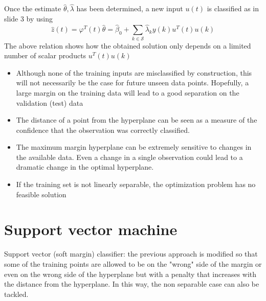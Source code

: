 \documentclass{book}
\theoremstyle{definition}
\theoremstyle{remark}
\theoremstyle{remark}
\begin{document}
Once the estimate $\hat{\theta},\hat{\lambda}$ has been determined, a new input $u(t)$ is classified as in slide 3 by using 
\[
    \hat{z}(t)=\varphi^T(t)\hat{\theta}=\hat{\beta}_0+\displaystyle\sum_{k\in\mathcal{S}}^{}\hat{\lambda}_ky(k)u^T(t)u(k)
\]
The above relation shows how the obtained solution only depends on a limited number of scalar products $u^T(t)u(k)$

\begin{itemize}
    \item Although none of the training inputs are misclassified by construction, this will not necessarily be the case for future unseen data points. Hopefully, a large margin on the training data will lead to a good separation on the validation (test) data
    \item The distance of a point from the hyperplane can be seen as a measure of the confidence that the observation was correctly classified. 
    \item The maximum margin hyperplane can be extremely sensitive to changes in the available data. Even a change in a single observation could lead to a dramatic change in the optimal hyperplane. 
    \item If the training set is not linearly separable, the optimization problem has no feasible solution
\end{itemize}

\section{Support vector machine}
Support vector (soft margin) classifier: the previous approach is modified so that some of the training points are allowed to be on the "wrong" side of the margin or even on the wrong side of the hyperplane but with a penalty that increases with the distance from the hyperplane. In this way, the non separable case can also be tackled. 
\end{document}
